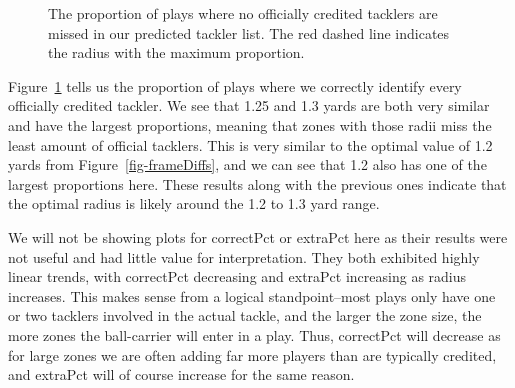 \documentclass[
  12pt]{article}
\begin{document}
\begin{figure}


\caption{\label{fig-noneMissingPct}The proportion of plays where no
officially credited tacklers are missed in our predicted tackler list.
The red dashed line indicates the radius with the maximum proportion.}

\end{figure}%

Figure~\ref{fig-noneMissingPct} tells us the proportion of plays where
we correctly identify every officially credited tackler. We see that
1.25 and 1.3 yards are both very similar and have the largest
proportions, meaning that zones with those radii miss the least amount
of official tacklers. This is very similar to the optimal value of 1.2
yards from Figure~\ref{fig-frameDiffs}, and we can see that 1.2 also has
one of the largest proportions here. These results along with the
previous ones indicate that the optimal radius is likely around the 1.2
to 1.3 yard range.

We will not be showing plots for correctPct or extraPct here as their
results were not useful and had little value for interpretation. They
both exhibited highly linear trends, with correctPct decreasing and
extraPct increasing as radius increases. This makes sense from a logical
standpoint--most plays only have one or two tacklers involved in the
actual tackle, and the larger the zone size, the more zones the
ball-carrier will enter in a play. Thus, correctPct will decrease as for
large zones we are often adding far more players than are typically
credited, and extraPct will of course increase for the same reason.
\end{document}
